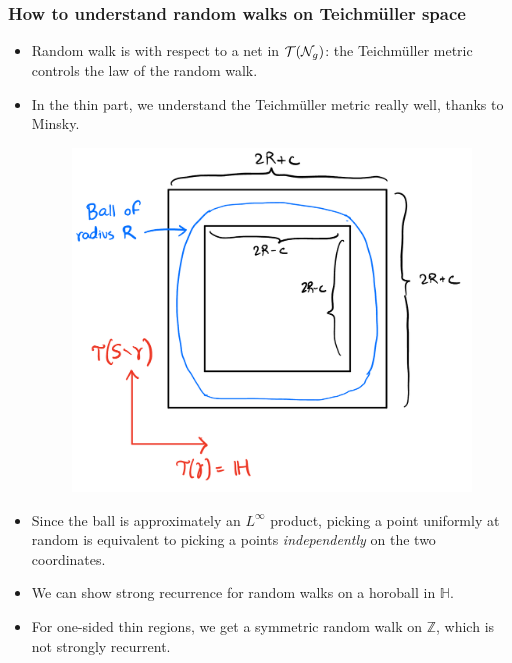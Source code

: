 \begin{frame}
  \frametitle{How to understand random walks on Teichmüller space}
  \begin{itemize}
  \item<2-> Random walk is with respect to a net in $\mathcal{T}(\mathcal{N}_g)$: the Teichmüller metric controls the law of the random walk.
  \item<3-> In the thin part, we understand the Teichmüller metric really well, thanks to Minsky.
     {
      \begin{figure}[h]
        \centering
        \includegraphics[scale=0.1]{minsky.png}
      \end{figure}
    }
  \item<5-> Since the ball is approximately an $L^{\infty}$ product, picking a point uniformly at random is equivalent to picking a points \emph{independently} on the two coordinates.
  \item<6-> We can show strong recurrence for random walks on a horoball in $\mathbb{H}$.
  \item<7-> For one-sided thin regions, we get a symmetric random walk on $\mathbb{Z}$, which is not strongly recurrent.
  \end{itemize}
\end{frame}


